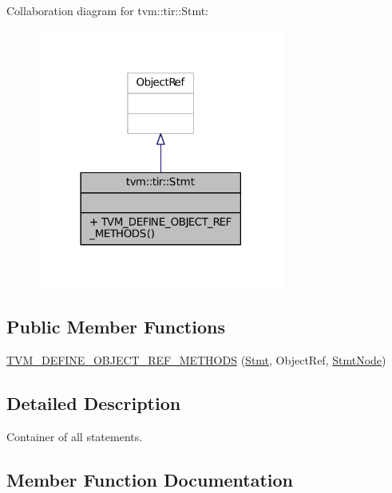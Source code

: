 Collaboration diagram for tvm\+:\+:tir\+:\+:Stmt\+:
\nopagebreak
\begin{figure}[H]
\begin{center}
\leavevmode
\includegraphics[width=230pt]{classtvm_1_1tir_1_1Stmt__coll__graph}
\end{center}
\end{figure}
\subsection*{Public Member Functions}
\begin{DoxyCompactItemize}
\item 
\hyperlink{classtvm_1_1tir_1_1Stmt_aaca2f7bd4110028470b82825bcbb87ac}{T\+V\+M\+\_\+\+D\+E\+F\+I\+N\+E\+\_\+\+O\+B\+J\+E\+C\+T\+\_\+\+R\+E\+F\+\_\+\+M\+E\+T\+H\+O\+DS} (\hyperlink{classtvm_1_1tir_1_1Stmt}{Stmt}, Object\+Ref, \hyperlink{classtvm_1_1tir_1_1StmtNode}{Stmt\+Node})
\end{DoxyCompactItemize}


\subsection{Detailed Description}
Container of all statements. 

\subsection{Member Function Documentation}
